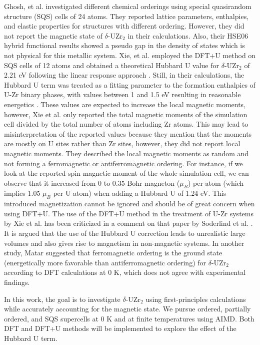 \documentclass[preprint,12pt]{elsarticle}
\begin{document}
Ghosh, et al. \cite{ghosh_chemical_2021} investigated different chemical orderings using special quasirandom structure (SQS) cells of 24 atoms. They reported lattice parameters, enthalpies, and elastic properties for structures with different ordering. However, they did not report the magnetic state of $\delta$-UZr$_2$ in their calculations. Also, their HSE06 hybrid functional results showed a pseudo gap in the density of states which is not physical for this metallic system. Xie, et al. \cite{xie_correlation_2013} employed the DFT+U method on SQS cells of 12 atoms and obtained a theoretical Hubbard U value for $\delta$-UZr$_2$ of 2.21 eV following the linear response approach \cite{cococcioni_linear_2005}. Still, in their calculations, the Hubbard U term was treated as a fitting parameter to the formation enthalpies of U-Zr binary phases, with values between 1 and 1.5 eV resulting in reasonable energetics \cite{xie_correlation_2013}. These values are expected to increase the local magnetic moments, however, Xie et al. \cite{xie_correlation_2013} only reported the total magnetic moments of the simulation cell divided by the total number of atoms including Zr atoms. This may lead to misinterpretation of the reported values because they mention that the moments are mostly on U sites rather than Zr sites, however, they did not report local magnetic moments. They described the local magnetic moments as random and not forming a ferromagnetic or antiferromagnetic ordering. For instance, if we look at the reported spin magnetic moment of the whole simulation cell, we can observe that it increased from 0 to 0.35 Bohr magneton ($\mu_B$) per atom (which implies 1.05 $\mu_B$ per U atom) when adding a Hubbard U of 1.24 eV. This introduced magnetization cannot be ignored and should be of great concern when using DFT+U. The use of the DFT+U method in the treatment of U-Zr systems by Xie et al. \cite{xie_correlation_2013} has been criticized in a comment on that paper by Soderlind et al. \cite{soderlind_comment_2014}. It is argued that the use of the Hubbard U correction leads to unrealistic large volumes and also gives rise to magnetism in non-magnetic systems. In another study, Matar \cite{matar_first_2017} suggested that ferromagnetic ordering is the ground state (energetically more favorable than antiferromagnetic ordering) for $\delta$-UZr$_2$ according to DFT calculations at 0 K, which does not agree with experimental findings. 

In this work, the goal is to investigate $\delta$-UZr$_2$ using first-principles calculations while accurately accounting for the magnetic state. We pursue ordered, partially ordered, and SQS supercells at 0 K and at finite temperatures using AIMD. Both DFT and DFT+U methods will be implemented to explore the effect of the Hubbard U term.
\end{document}
